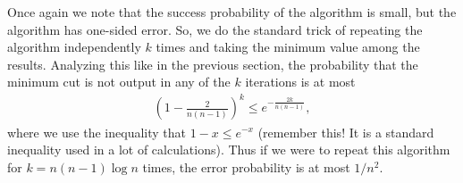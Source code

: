 Once again we note that the success probability of the algorithm is small, but the algorithm has one-sided error. So, we do the standard trick of repeating the algorithm independently $k$ times and taking the minimum value among the results. Analyzing this like in the previous section, the probability that the minimum cut is not output in any of the $k$ iterations is at most
\begin{align*}
	\left(1 - \frac{2}{n(n-1)} \right)^k \leq e^{-\frac{2k}{n(n-1)}},
\end{align*}
where we use the inequality that $1-x \leq e^{-x}$ (remember this! It is a standard inequality used in a lot of calculations). Thus if we were to repeat this algorithm for $k=n(n-1)\log n$ times, the error probability is at most $1/n^2$.